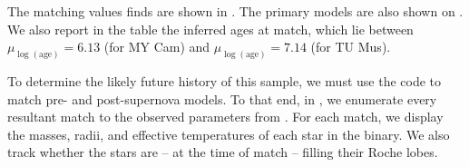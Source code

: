 The matching values  finds are shown in . The primary models are also shown on . We also report in the table the inferred ages at match, which lie between $\mu_{\log(\text{age})}=6.13$ (for MY Cam) and $\mu_{\log(\text{age})}=7.14$ (for TU Mus).





To determine the likely future history of this sample, we must use the  code to match pre- and post-supernova models. To that end, in , we enumerate every resultant match to the observed parameters from . For each match, we display the masses, radii, and effective temperatures of each star in the binary. We also track whether the stars are -- at the time of match -- filling their Roche lobes.

